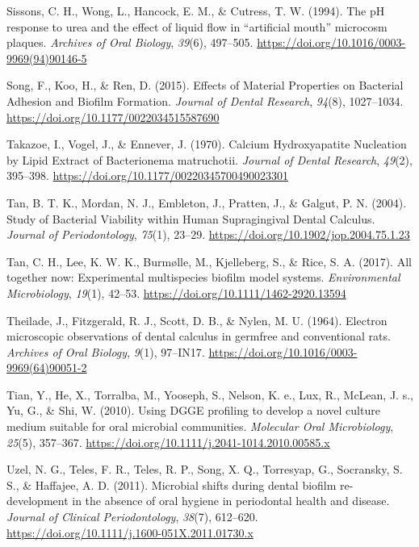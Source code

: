 \documentclass[
  b5paper,
]{book}
\newlength{\cslhangindent}
\newenvironment{CSLReferences}[2] %
 {\begin{list}{}{%
  \setlength{\itemindent}{0pt}
  \setlength{\leftmargin}{0pt}
  \setlength{\parsep}{0pt}
  \ifodd #1
   \setlength{\leftmargin}{\cslhangindent}
   \setlength{\itemindent}{-1\cslhangindent}
  \fi
  \setlength{\itemsep}{#2\baselineskip}}}
 {\end{list}}
\begin{document}
\begin{CSLReferences}{1}{0}
Sissons, C. H., Wong, L., Hancock, E. M., \& Cutress, T. W. (1994). The
{pH} response to urea and the effect of liquid flow in {``artificial
mouth''} microcosm plaques. \emph{Archives of Oral Biology},
\emph{39}(6), 497--505.
\url{https://doi.org/10.1016/0003-9969(94)90146-5}

Song, F., Koo, H., \& Ren, D. (2015). Effects of {Material Properties}
on {Bacterial Adhesion} and {Biofilm Formation}. \emph{Journal of Dental
Research}, \emph{94}(8), 1027--1034.
\url{https://doi.org/10.1177/0022034515587690}

Takazoe, I., Vogel, J., \& Ennever, J. (1970). Calcium {Hydroxyapatite
Nucleation} by {Lipid Extract} of {Bacterionema} matruchotii.
\emph{Journal of Dental Research}, \emph{49}(2), 395--398.
\url{https://doi.org/10.1177/00220345700490023301}

Tan, B. T. K., Mordan, N. J., Embleton, J., Pratten, J., \& Galgut, P.
N. (2004). Study of {Bacterial Viability} within {Human Supragingival
Dental Calculus}. \emph{Journal of Periodontology}, \emph{75}(1),
23--29. \url{https://doi.org/10.1902/jop.2004.75.1.23}

Tan, C. H., Lee, K. W. K., Burmølle, M., Kjelleberg, S., \& Rice, S. A.
(2017). All together now: Experimental multispecies biofilm model
systems. \emph{Environmental Microbiology}, \emph{19}(1), 42--53.
\url{https://doi.org/10.1111/1462-2920.13594}

Theilade, J., Fitzgerald, R. J., Scott, D. B., \& Nylen, M. U. (1964).
Electron microscopic observations of dental calculus in germfree and
conventional rats. \emph{Archives of Oral Biology}, \emph{9}(1),
97--IN17. \url{https://doi.org/10.1016/0003-9969(64)90051-2}

Tian, Y., He, X., Torralba, M., Yooseph, S., Nelson, K. e., Lux, R.,
McLean, J. s., Yu, G., \& Shi, W. (2010). Using {DGGE} profiling to
develop a novel culture medium suitable for oral microbial communities.
\emph{Molecular Oral Microbiology}, \emph{25}(5), 357--367.
\url{https://doi.org/10.1111/j.2041-1014.2010.00585.x}

Uzel, N. G., Teles, F. R., Teles, R. P., Song, X. Q., Torresyap, G.,
Socransky, S. S., \& Haffajee, A. D. (2011). Microbial shifts during
dental biofilm re-development in the absence of oral hygiene in
periodontal health and disease. \emph{Journal of Clinical
Periodontology}, \emph{38}(7), 612--620.
\url{https://doi.org/10.1111/j.1600-051X.2011.01730.x}


\end{CSLReferences}
\end{document}
